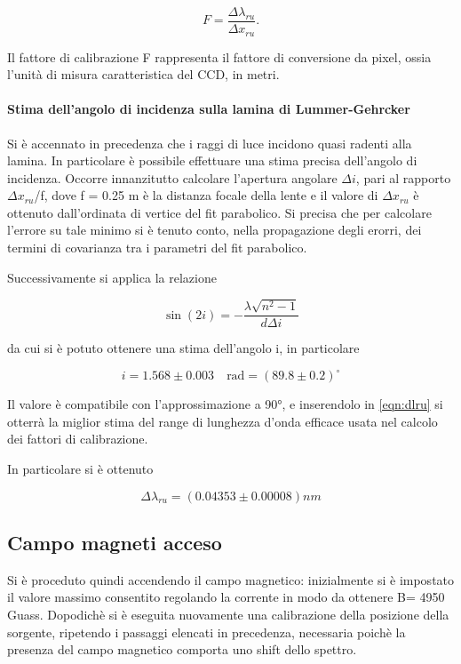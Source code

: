 \documentclass{article}
\begin{document}
	\begin{equation}
		F = \frac{\Delta\lambda_{ru}}{\Delta x_{ru}}.
	\end{equation}

	Il fattore di calibrazione F rappresenta il fattore di conversione da pixel, 
	ossia l'unità di misura caratteristica del CCD, in metri.




	\paragraph{Stima dell'angolo di incidenza sulla lamina di Lummer-Gehrcker}
	Si è accennato in precedenza che i raggi di luce incidono quasi radenti
	alla lamina. In particolare è possibile effettuare una stima precisa dell'angolo
	di incidenza. Occorre innanzitutto calcolare l'apertura angolare
	$\Delta i$, pari al rapporto $\Delta x_{ru}$/f, dove f = 0.25 m è la distanza
	focale della lente e il valore di $\Delta x_{ru}$ è ottenuto dall'ordinata 
	di vertice del fit parabolico. Si precisa che per calcolare l'errore su tale 
	minimo si è tenuto conto, nella propagazione degli erorri, dei termini di 
	covarianza tra i parametri del fit parabolico.
	
	Successivamente si applica la relazione

	\begin{equation}
		\sin(2i) = - \frac{\lambda \sqrt{n^2-1}}{d \Delta i}
	\end{equation}

	da cui si è potuto ottenere una stima dell'angolo i, in particolare

	\[
		i = 1.568 \pm 0.003 \quad \text{rad} = ( 89.8 \pm 0.2 ) ^{\circ}
	\]

	Il valore è compatibile con l'approssimazione a 90°, e inserendolo in \ref{eqn:dlru}
	si otterrà la miglior stima del range di lunghezza d'onda efficace usata
	nel calcolo dei fattori di calibrazione.

	In particolare si è ottenuto

	\[
		\Delta\lambda_{ru} = (0.04353 \pm 0.00008) nm 
	\]	

	\subsection*{Campo magneti acceso}
	
	Si è proceduto quindi accendendo il campo magnetico: inizialmente si è impostato il valore massimo consentito regolando la corrente in modo da ottenere B= 4950 Guass. 
	Dopodichè si è eseguita nuovamente una calibrazione della posizione della sorgente, ripetendo i passaggi elencati in precedenza, necessaria poichè la presenza del campo magnetico comporta uno shift dello spettro.
\end{document}
